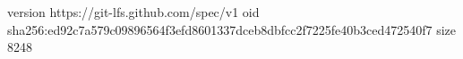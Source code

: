 version https://git-lfs.github.com/spec/v1
oid sha256:ed92c7a579c09896564f3efd8601337dceb8dbfcc2f7225fe40b3ced472540f7
size 8248
